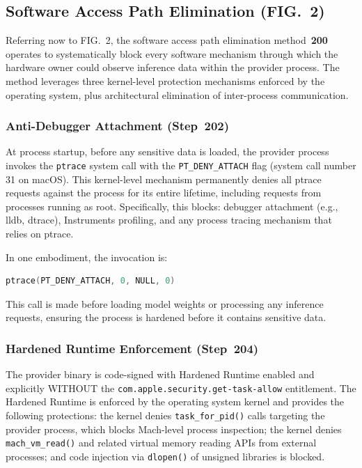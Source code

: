 \documentclass[11pt,letterpaper]{article}
\begin{document}
\subsection{Software Access Path Elimination (FIG.~2)}

Referring now to FIG.~2, the software access path elimination method~\textbf{200} operates to systematically block every software mechanism through which the hardware owner could observe inference data within the provider process. The method leverages three kernel-level protection mechanisms enforced by the operating system, plus architectural elimination of inter-process communication.

\subsubsection{Anti-Debugger Attachment (Step~202)}

At process startup, before any sensitive data is loaded, the provider process invokes the \texttt{ptrace} system call with the \texttt{PT\_DENY\_ATTACH} flag (system call number 31 on macOS). This kernel-level mechanism permanently denies all ptrace requests against the process for its entire lifetime, including requests from processes running as root. Specifically, this blocks: debugger attachment (e.g., lldb, dtrace), Instruments profiling, and any process tracing mechanism that relies on ptrace.

In one embodiment, the invocation is:
\begin{lstlisting}[language=C]
ptrace(PT_DENY_ATTACH, 0, NULL, 0)
\end{lstlisting}

This call is made before loading model weights or processing any inference requests, ensuring the process is hardened before it contains sensitive data.

\subsubsection{Hardened Runtime Enforcement (Step~204)}

The provider binary is code-signed with Hardened Runtime enabled and explicitly WITHOUT the \texttt{com.apple.security.get-task-allow} entitlement. The Hardened Runtime is enforced by the operating system kernel and provides the following protections: the kernel denies \texttt{task\_for\_pid()} calls targeting the provider process, which blocks Mach-level process inspection; the kernel denies \texttt{mach\_vm\_read()} and related virtual memory reading APIs from external processes; and code injection via \texttt{dlopen()} of unsigned libraries is blocked.
\end{document}
